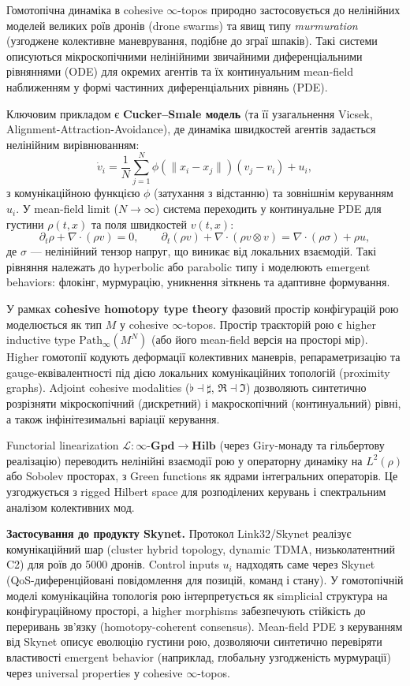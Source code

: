 \documentclass[a4paper,12pt]{article}
\begin{document}
Гомотопічна динаміка в cohesive \(\infty\)-topos природно застосовується до нелінійних моделей великих роїв дронів (drone swarms) та явищ типу \emph{murmuration} (узгоджене колективне маневрування, подібне до зграї шпаків). Такі системи описуються мікроскопічними нелінійними звичайними диференціальними рівняннями (ODE) для окремих агентів та їх континуальним mean-field наближенням у формі частинних диференціальних рівнянь (PDE).

Ключовим прикладом є \textbf{Cucker--Smale модель} (та її узагальнення Vicsek, Alignment-Attraction-Avoidance), де динаміка швидкостей агентів задається нелінійним вирівнюванням:
\[
\dot{v}_i = \frac{1}{N} \sum_{j=1}^N \phi(\|x_i - x_j\|) (v_j - v_i) + u_i,
\]
з комунікаційною функцією \(\phi\) (затухання з відстанню) та зовнішнім керуванням \(u_i\). У mean-field limit (\(N \to \infty\)) система переходить у континуальне PDE для густини \(\rho(t,x)\) та поля швидкостей \(v(t,x)\):
\[
\partial_t \rho + \nabla \cdot (\rho v) = 0, \qquad \partial_t (\rho v) + \nabla \cdot (\rho v \otimes v) = \nabla \cdot (\rho \sigma) + \rho u,
\]
де \(\sigma\) — нелінійний тензор напруг, що виникає від локальних взаємодій. Такі рівняння належать до hyperbolic або parabolic типу і моделюють emergent behaviors: флокінг, мурмурацію, уникнення зіткнень та адаптивне формування.

\newpage
У рамках \textbf{cohesive homotopy type theory} фазовий простір конфігурацій рою моделюється як тип \(M\) у cohesive \(\infty\)-topos. Простір траєкторій рою є higher inductive type \(\mathrm{Path}_\infty(M^N)\) (або його mean-field версія на просторі мір). Higher гомотопії кодують деформації колективних маневрів, репараметризацію та gauge-еквівалентності під дією локальних комунікаційних топологій (proximity graphs). Adjoint cohesive modalities (\(\flat \dashv \sharp\), \(\Re \dashv \Im\)) дозволяють синтетично розрізняти мікроскопічний (дискретний) і макроскопічний (континуальний) рівні, а також інфінітезимальні варіації керування.

Functorial linearization \(\mathcal{L} : \infty\text{-}\mathbf{Gpd} \to \mathbf{Hilb}\) (через Giry-монаду та гільбертову реалізацію) переводить нелінійні взаємодії рою у операторну динаміку на \(L^2(\rho)\) або Sobolev просторах, з Green functions як ядрами інтегральних операторів. Це узгоджується з rigged Hilbert space для розподілених керувань і спектральним аналізом колективних мод.

\textbf{Застосування до продукту Skynet.} Протокол Link32/Skynet реалізує комунікаційний шар (cluster hybrid topology, dynamic TDMA, низьколатентний C2) для роїв до 5000 дронів. Control inputs \(u_i\) надходять саме через Skynet (QoS-диференційовані повідомлення для позицій, команд і стану). У гомотопічній моделі комунікаційна топологія рою інтерпретується як simplicial структура на конфігураційному просторі, а higher morphisms забезпечують стійкість до переривань зв’язку (homotopy-coherent consensus). Mean-field PDE з керуванням від Skynet описує еволюцію густини рою, дозволяючи синтетично перевіряти властивості emergent behavior (наприклад, глобальну узгодженість мурмурації) через universal properties у cohesive \(\infty\)-topos.
\end{document}
